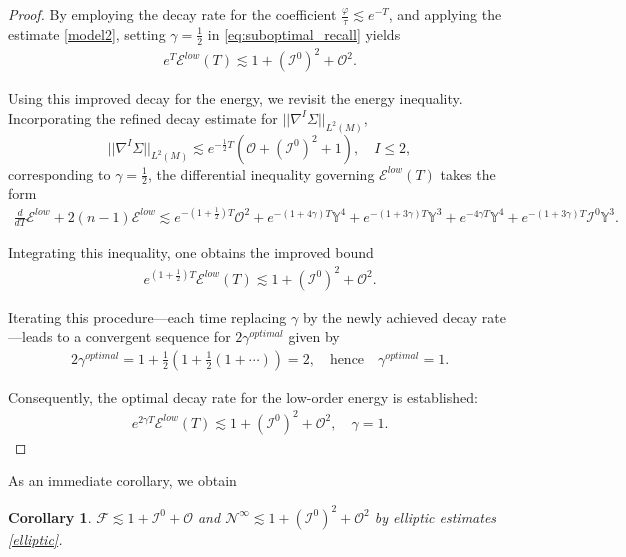 \documentclass{amsart}
\newtheorem{corollary}{Corollary}[section]
\begin{document}
\begin{proof}
\noindent By employing the decay rate for the coefficient $\frac{\varphi}{\tau} \lesssim e^{-T}$, and applying the estimate \eqref{model2}, setting $\gamma = \frac{1}{2}$ in \eqref{eq:suboptimal_recall} yields
\begin{align}
e^{T} \mathscr{E}^{low}(T) \lesssim 1 + (\mathcal{I}^0)^2 + \mathcal{O}^2.
\end{align}

\noindent Using this improved decay for the energy, we revisit the energy inequality. Incorporating the refined decay estimate for $||\nabla^{I} \Sigma||_{L^2(M)}$,
\[
||\nabla^{I} \Sigma||_{L^2(M)} \lesssim e^{-\frac{1}{2} T} \left( \mathcal{O} + (\mathcal{I}^0)^2 + 1 \right), \quad I \leq 2,
\]
corresponding to $\gamma = \frac{1}{2}$, the differential inequality governing $\mathscr{E}^{low}(T)$ takes the form
\begin{align}
\frac{d}{dT} \mathscr{E}^{low}\nonumber + 2(n-1) \mathscr{E}^{low} \lesssim e^{-(1+\frac{1}{2}) T} \mathcal{O}^2 + e^{-(1+4\gamma) T} \mathds{Y}^4 + e^{-(1+3\gamma) T} \mathds{Y}^3 + e^{-4\gamma T} \mathds{Y}^4 + e^{-(1+3\gamma) T} \mathcal{I}^0 \mathds{Y}^3.
\end{align}

\noindent Integrating this inequality, one obtains the improved bound
\begin{align}
e^{(1+\frac{1}{2}) T} \mathscr{E}^{low}(T) \lesssim 1 + (\mathcal{I}^0)^2 + \mathcal{O}^2.
\end{align}

\noindent Iterating this procedure—each time replacing $\gamma$ by the newly achieved decay rate—leads to a convergent sequence for $2 \gamma^{optimal}$ given by
\begin{align}
2 \gamma^{optimal} = 1 + \frac{1}{2} \left( 1 + \frac{1}{2} \left( 1 + \cdots \right) \right) = 2,
\quad \text{hence} \quad \gamma^{optimal} = 1.
\end{align}

\noindent Consequently, the optimal decay rate for the low-order energy is established:
\begin{align}
e^{2\gamma T} \mathscr{E}^{low}(T) \lesssim 1 + (\mathcal{I}^0)^2 + \mathcal{O}^2, \quad \gamma = 1.
\end{align}
\end{proof}
\noindent As an immediate corollary, we obtain 
\begin{corollary}
 $\mathcal{F}\lesssim 1+\mathcal{I}^{0}+\mathcal{O}$ and $\mathcal{N}^{\infty}\lesssim 1+(\mathcal{I}^{0})^{2}+\mathcal{O}^{2}$ by elliptic estimates \ref{elliptic}.   
\end{corollary}
\end{document}

